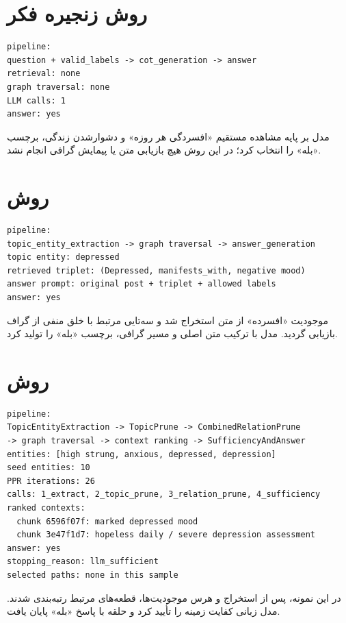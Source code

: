 \section{روش زنجیره فکر }
\begin{latin}\footnotesize\begin{verbatim}
pipeline:
question + valid_labels -> cot_generation -> answer
retrieval: none
graph traversal: none
LLM calls: 1
answer: yes
\end{verbatim}
\end{latin}
مدل بر پایه مشاهده مستقیم «افسردگی هر روزه» و دشوارشدن زندگی، برچسب «بله» را انتخاب کرد؛ در این روش هیچ بازیابی متن یا پیمایش گرافی انجام نشد.

\section{روش }
\begin{latin}\footnotesize\begin{verbatim}
pipeline:
topic_entity_extraction -> graph traversal -> answer_generation
topic entity: depressed
retrieved triplet: (Depressed, manifests_with, negative mood)
answer prompt: original post + triplet + allowed labels
answer: yes
\end{verbatim}
\end{latin}
موجودیت «افسرده» از متن استخراج شد و سه‌تایی مرتبط با خلق منفی از گراف بازیابی گردید. مدل با ترکیب متن اصلی و مسیر گرافی، برچسب «بله» را تولید کرد.

\section{روش }
\begin{latin}\footnotesize\begin{verbatim}
pipeline:
TopicEntityExtraction -> TopicPrune -> CombinedRelationPrune
-> graph traversal -> context ranking -> SufficiencyAndAnswer
entities: [high strung, anxious, depressed, depression]
seed entities: 10
PPR iterations: 26
calls: 1_extract, 2_topic_prune, 3_relation_prune, 4_sufficiency
ranked contexts:
  chunk 6596f07f: marked depressed mood
  chunk 3e47f1d7: hopeless daily / severe depression assessment
answer: yes
stopping_reason: llm_sufficient
selected paths: none in this sample
\end{verbatim}
\end{latin}
در این نمونه، پس از استخراج و هرس موجودیت‌ها، قطعه‌های مرتبط رتبه‌بندی شدند. مدل زبانی کفایت زمینه را تأیید کرد و حلقه با پاسخ «بله» پایان یافت.


